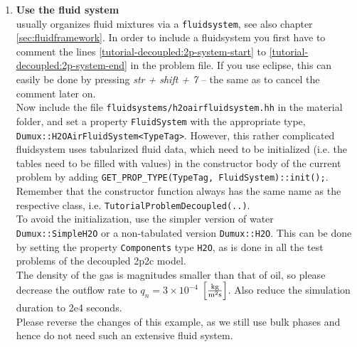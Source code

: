 \begin{enumerate}
\item \textbf{Use the \Dumux fluid system}\label{dec-ex1-fluidsystem} \\
\Dumux usually organizes fluid mixtures via a \texttt{fluidsystem}, see also chapter
\ref{sec:fluidframework}. In order to include a fluidsystem you first have to comment
the lines \ref{tutorial-decoupled:2p-system-start} to \ref{tutorial-decoupled:2p-system-end}
in the problem file. If you use eclipse, this can easily be done by pressing
\textit{str + shift + 7} -- the same as to cancel the comment later on.\\
Now include the file \texttt{fluidsystems/h2oairfluidsystem.hh} in the material folder,
and set a property \texttt{FluidSystem} with the appropriate type,
\texttt{Dumux::H2OAirFluidSystem<TypeTag>}. However, this rather complicated fluidsystem
uses tabularized fluid data, which need to be initialized (i.e. the tables need to be
filled with values) in the constructor body of the current problem by adding
\texttt{GET\_PROP\_TYPE(TypeTag, FluidSystem)::init();}. Remember that the constructor
function always has the same name as the respective class, i.e. \texttt{TutorialProblemDecoupled(..)}.\\
To avoid the initialization, use the simpler version of water \texttt{Dumux::SimpleH2O}
or a non-tabulated version \texttt{Dumux::H2O}. This can be done by setting the property
\texttt{Components} type \texttt{H2O},
as is done in all the test problems of the decoupled 2p2c model.\\
The density of the gas is magnitudes smaller than that of oil, so please decrease
the outflow rate to $q_n = 3 \times 10^{-4}$ $\left[\frac{\textnormal{kg}}{\textnormal{m}^2 \textnormal{s}}\right]$.
Also reduce the simulation duration to 2e4 seconds.\\
Please reverse the changes of this example, as we still use bulk phases and
hence do not need such an extensive fluid system.


\end{enumerate}
